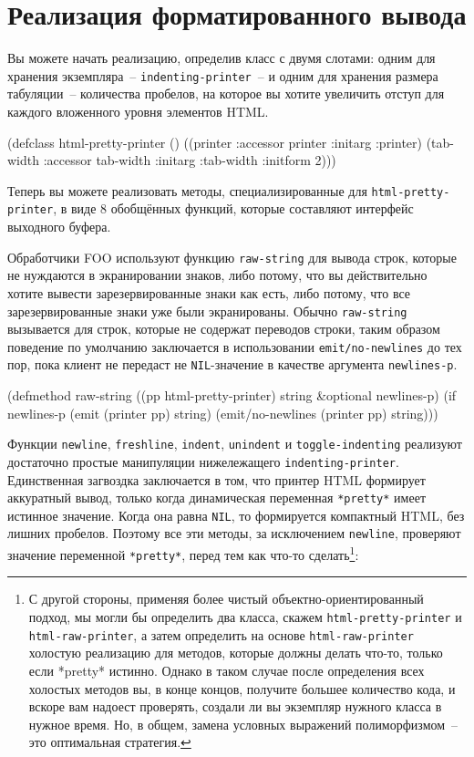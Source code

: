 \section{Реализация форматированного вывода}

Вы можете начать реализацию, определив класс с двумя слотами: одним для хранения
экземпляра~-- \lstinline{indenting-printer}~-- и одним для хранения размера табуляции~--
количества пробелов, на которое вы хотите увеличить отступ для каждого вложенного уровня
элементов HTML.

\begin{myverb}
(defclass html-pretty-printer ()
  ((printer   :accessor printer   :initarg :printer)
   (tab-width :accessor tab-width :initarg :tab-width :initform 2)))
\end{myverb}

Теперь вы можете реализовать методы, специализированные для \lstinline{html-pretty-printer}, в
виде 8 обобщённых функций, которые составляют интерфейс выходного буфера.

Обработчики FOO используют функцию \lstinline{raw-string} для вывода строк, которые не
нуждаются в экранировании знаков, либо потому, что вы действительно хотите вы\-вес\-ти
зарезервированные знаки как есть, либо потому, что все зарезервированные знаки уже были
экранированы. Обычно \lstinline{raw-string} вызывается для строк, которые не содержат переводов
строки, таким образом поведение по умолчанию заключается в использовании
\lstinline{emit/no-newlines} до тех пор, пока клиент не передаст не \lstinline{NIL}-значение в
качестве аргумента \lstinline{newlines-p}.

\begin{myverb}
(defmethod raw-string ((pp html-pretty-printer) string &optional newlines-p)
  (if newlines-p
    (emit (printer pp) string)
    (emit/no-newlines (printer pp) string)))
\end{myverb}

Функции \lstinline{newline}, \lstinline{freshline}, \lstinline{indent}, \lstinline{unindent} и
\lstinline{toggle-indenting} реализуют достаточно простые манипуляции нижележащего
\lstinline{indenting-printer}. Единственная загвоздка заключается в том, что принтер HTML
формирует аккуратный вывод, только когда динамическая переменная \lstinline{*pretty*} имеет
истинное значение. Когда она равна \lstinline{NIL}, то формируется компактный HTML, без лишних
пробелов. Поэтому все эти методы, за исключением \lstinline{newline}, проверяют значение
переменной \lstinline{*pretty*}, перед тем как что-то сделать\footnote{С другой стороны,
  применяя более чистый объектно-ориентированный подход, мы могли бы определить два
  класса, скажем \lstinline{html-pretty-printer} и \lstinline{html-raw-printer}, а затем определить
  на основе \lstinline{html-raw-printer} холостую реализацию для методов, которые должны делать
  что-то, только если *pretty* истинно. Однако в таком случае после определения всех
  холостых методов вы, в конце концов, получите большее количество кода, и вскоре вам
  надоест проверять, создали ли вы экземпляр нужного класса в нужное время. Но, в общем,
  замена условных выражений полиморфизмом~-- это оптимальная стратегия.}:

